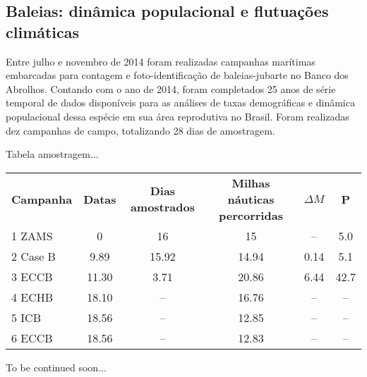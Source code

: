 \subsection{Baleias: dinâmica populacional e flutuações climáticas} %
\label{sec:dinam-popul-de} 

Entre julho e novembro de 2014 foram realizadas campanhas marítimas embarcadas para contagem e foto-identificação de baleias-jubarte no Banco dos Abrolhos. Contando com o ano de 2014, foram completados 25 anos de série temporal de dados disponíveis para as análises de taxas demográficas e dinâmica populacional dessa espécie em sua área reprodutiva no Brasil. Foram realizadas dez campanhas de campo, totalizando 28 dias de amostragem.


Tabela amostragem...
\begin{tabular}{lccccc}
  \textbf{Campanha}        & \textbf{Datas} & \textbf{Dias amostrados}  & \textbf{Milhas náuticas percorridas} &  \textbf{$\Delta M$} & \textbf{P} \\   
    1 ZAMS           & 0      & 16     & 15    & --   & 5.0   \\            
    2 Case B       & 9.89   & 15.92  & 14.94 & 0.14 & 5.1   \\
    3 ECCB        & 11.30  &  3.71  & 20.86 & 6.44 & 42.7  \\
    4 ECHB      & 18.10  & --     & 16.76 &  --  & --    \\
    5 ICB       & 18.56  & --     & 12.85 &  --  & --    \\    
    6 ECCB      & 18.56  & --     & 12.83 &  --  & --    \\
  \end{tabular}
  
  To be continued soon...